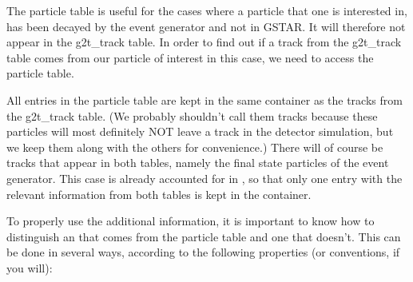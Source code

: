 The particle table is useful for the cases where a particle that one is
interested in, has been decayed by the event generator and not in
GSTAR.  It will therefore not appear in the g2t\_track table.  In
order to find out if a track from the g2t\_track table comes from
our particle of interest in this case, we need to access the particle
table.

All entries in the particle table are kept in the same container
as the tracks from the g2t\_track table.  (We probably shouldn't call
them tracks because these particles will most definitely NOT leave a
track in the detector simulation, but we keep them along with the others
for convenience.)  There will of course be tracks that appear in both
tables, namely the final state particles of the event generator.  This
case is already accounted for in \StMcEvent, so that only one entry
with the relevant information from both tables is kept in the container.

To properly use the additional information, it is important to know how to
distinguish an  that comes from the particle table
and one that doesn't.  This can be done in several ways, according to
the following properties (or conventions, if you will):

